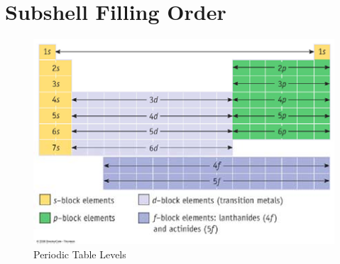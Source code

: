 \documentclass[
	chapter=7,
	title={Quantum Theory {\&} the Electronic Structure of Atoms},
	showanswers=true,
]{chem122notes}
\begin{document}
\section{Subshell Filling Order}\label{sec:subshell-filling-order}
\begin{figure}[H]
	\centering
	\includegraphics[width=\textwidth]{chapter7/periodic-table}
	\caption{Periodic Table Levels}
	\label{fig:period-table-levels}
\end{figure}
\end{document}
